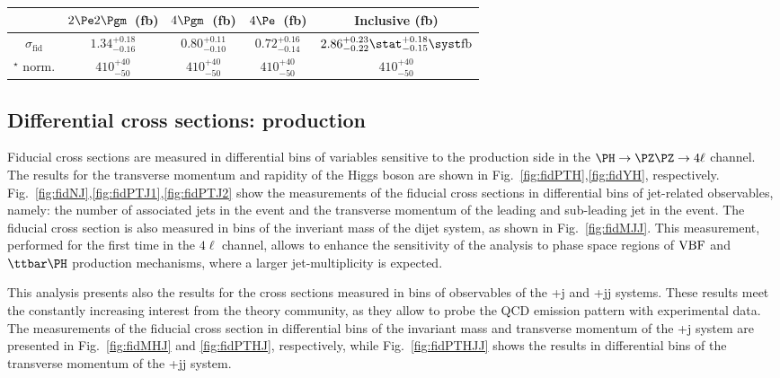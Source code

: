 \begin{table}[!htb]
	\centering
	\renewcommand{\arraystretch}{1.5}
	\begin{tabular}{ccccc}
		& $2\Pe 2\Pgm$~(fb) & $4\Pgm$~(fb) & $4\Pe$~(fb) & Inclusive (fb) \\
		\hline
		$\sigma_{{\mathrm{fid}}} $& $1.34^{+0.18}_{-0.16}$ & $0.80^{+0.11}_{-0.10}$ & $0.72^{+0.16}_{-0.14}$ &  $2.86^{+0.23}_{-0.22}\stat^{+0.18}_{-0.15}\syst \unit{fb}$  \\
		 \PZ\PZ$^\star$ norm. & $410^{+40}_{-50}$ & $410^{+40}_{-50}$ & $410^{+40}_{-50}$ & $410^{+40}_{-50}$   \\
	\end{tabular}
\end{table}

\clearpage

\subsection{Differential cross sections: production}
Fiducial cross sections are measured in differential bins of variables sensitive to the production side in the $\HZZfl$ channel.
The results for the transverse momentum and rapidity of the Higgs boson are shown in Fig.~\ref{fig:fidPTH},\ref{fig:fidYH}, respectively.
Fig.~\ref{fig:fidNJ},\ref{fig:fidPTJ1},\ref{fig:fidPTJ2} show the measurements of the fiducial cross sections in differential bins of jet-related observables, namely: the number of associated jets in the event and the transverse momentum of the leading and sub-leading jet in the event.
The fiducial cross section is also measured in bins of the inveriant mass of the dijet system, as shown in Fig.~\ref{fig:fidMJJ}. This measurement, performed for the first time in the $4\ell$ channel, allows to enhance the sensitivity of the analysis to phase space regions of $\mathrm{VBF}$ and $\ttH$ production mechanisms, where a larger jet-multiplicity is expected.

This analysis presents also the results for the cross sections measured in bins of observables of the \PH+j and \PH+jj systems. These results meet the constantly increasing interest from the theory community, as they allow to probe the QCD emission pattern with experimental data.
The measurements of the fiducial cross section in differential bins of the invariant mass and transverse momentum of the \PH+j system are presented in Fig.~\ref{fig:fidMHJ} and \ref{fig:fidPTHJ}, respectively, while Fig.~\ref{fig:fidPTHJJ} shows the results in differential bins of the transverse momentum of the \PH+jj system.

